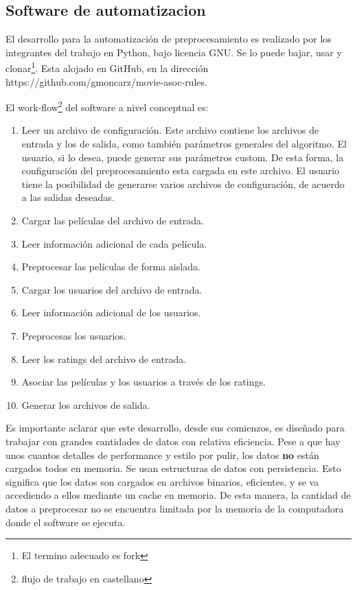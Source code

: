 \documentclass[journal]{IEEEtran}
\begin{document}
\subsection{Software de automatizacion}
El desarrollo para la automatización de preprocesamiento es realizado por 
los integrantes del trabajo en Python, bajo licencia GNU. Se lo puede bajar,
usar y clonar\footnote{El termino adecuado es fork}. Esta alojado en GitHub, en la 
dirección https://github.com/gmoncarz/movie-asoc-rules. 

El work-flow\footnote{flujo de trabajo en castellano} del software a nivel conceptual es:
\begin{enumerate}
\item Leer un archivo de configuración. Este archivo 
contiene los archivos de entrada y los de salida,
como también parámetros generales del algoritmo.
El usuario, si lo desea, puede generar sus parámetros custom. De
esta forma, la configuración del preprocesamiento esta cargada en este
archivo. El usuario tiene la posibilidad de generarse varios archivos
de configuración, de acuerdo a las salidas deseadas.
\item Cargar las películas del archivo de entrada.
\item Leer información adicional de cada película.
\item Preprocesar las películas de forma aislada.
\item Cargar los usuarios del archivo de entrada.
\item Leer información adicional de los usuarios.
\item Preprocesas los usuarios.
\item Leer los ratings del archivo de entrada.
\item Asociar las películas y los usuarios a través de los ratings.
\item Generar los archivos de salida.
\end{enumerate}

Es importante aclarar que este desarrollo, desde sus comienzos,
es diseñado para trabajar con grandes cantidades de datos con relativa
eficiencia. Pese a que hay unos cuantos detalles de performance 
y estilo por pulir,
los datos \textbf{no} están cargados todos en memoria. Se usan estructuras
de datos con persistencia. Esto significa que los datos son cargados en
archivos binarios, eficientes, y se va accediendo a ellos mediante
un cache en memoria. De esta manera, la cantidad de datos a preprocesar
no se encuentra limitada por la memoria de la computadora donde
el software se ejecuta.
\end{document}
